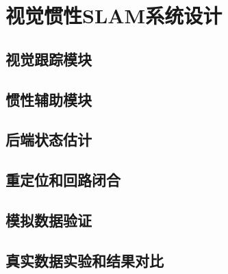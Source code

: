 \chapter{视觉惯性SLAM系统设计}\label{ch:res}

\section{视觉跟踪模块}

\section{惯性辅助模块}

\section{后端状态估计}

\section{重定位和回路闭合}

\section{模拟数据验证}

\section{真实数据实验和结果对比}

